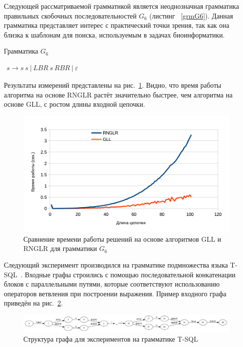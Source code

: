 Следующей рассматриваемой грамматикой является неоднозначная грамматика правильных скобочных последовательностей $G_6$ (листинг ~\ref{grmG6}). Данная грамматика представляет интерес с практический точки зрения, так как она близка к шаблонам для поиска, используемым в задачах биоинформатики. 

\begin{listing}
\caption{Грамматика $G_6$}
\label{grmG6}
\centering
$\begin{array}{rl}
s \rightarrow s \ s \ |  \ LBR \ s \ RBR \ | \ \varepsilon 
\end{array}$
\end{listing}

Результаты измерений представлены на рис.~\ref{exp2}. Видно, что время работы алгоритма на основе RNGLR растёт значительно быстрее, чем алгоритма на основе GLL, с ростом длины входной цепочки. 

\begin{figure}
 \centering
 \includegraphics[width=\textwidth]{Ragozina/pics/Brs.pdf}
 \caption{Сравнение времени работы решений на основе алгоритмов GLL и RNGLR для грамматики $G_6$}
 \label{exp2}
\end{figure}

Следующий эксперимент производился на грамматике подмножества языка T-SQL~\cite{YCZOO}. Входные графы строились с помощью последовательной конкатенации блоков с параллельными путями, которые соответствуют использованию операторов ветвления при построении выражения. Пример входного графа приведён на рис.~\ref{SQLInp}.

\begin{figure}
 \centering
 \includegraphics[width=\textwidth]{Ragozina/pics/SQLInput}
 \caption{Структура графа для экспериментов на грамматике T-SQL}
 \label{SQLInp}
\end{figure}

